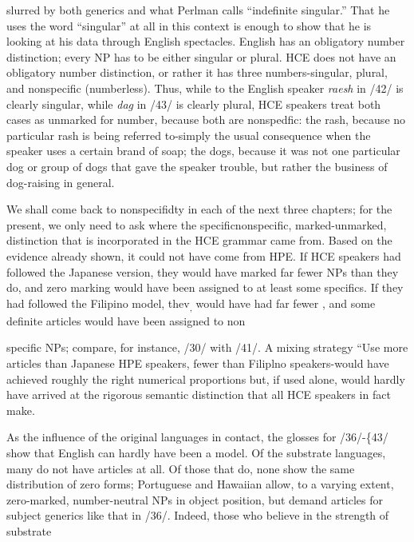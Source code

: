slurred by both generics and what Perlman calls ``indefinite singular.'' That he uses the word ``singular'' at all in this context is enough to show that he is looking at his data through English spectacles. English has an obligatory number distinction; every NP has to be either singular or plural. HCE does not have an obligatory number distinction, or rather it has three numbers-singular, plural, and nonspecific (number\-less). Thus, while to the English speaker \textit{raesh} in /42/ is clearly singular, while \textit{d}\textit{ag} in /43/ is clearly plural, HCE speakers treat both cases as unmarked for number, because both are nonspedfic: the rash, because no particular rash is being referred to-simply the usual consequence when the speaker uses a certain brand of soap; the dogs, because it was not one particular dog or group of dogs that gave the speaker trouble, but rather the business of dog-raising in general.

We shall come back to nonspecifidty in each of the next three chapters; for the present, we only need to ask where the specific\-nonspecific, marked-unmarked, distinction that is incorporated in the HCE grammar came from. Based on the evidence already shown, it could not have come from HPE. If HCE speakers had followed the Japanese version, they would have marked far fewer NPs than they do, and zero marking would have been assigned to at least some specifics. If they had followed the Filipino model, thev\textsubscript{,}\textsubscript{ }would have had far fewer \zeros, and some definite articles would have been assigned to non\-

specific NPs; compare, for instance, /30/ with /41/. A mixing strategy\- ``Use more articles than Japanese HPE speakers, fewer than Filiplno speakers{\textquotedbl}-would have achieved roughly the right numerical propor\-tions but, if used alone, would hardly have arrived at the rigorous semantic distinction that all HCE speakers in fact make.

As the influence of the original languages in contact, the glosses for /36/-\{43/ show that English can hardly have been a model. Of the substrate languages, many do not have articles at all. Of those that do, none show the same distribution of zero forms; Portuguese and Hawaiian allow, to a varying extent, zero-marked, number-neutral NPs in object position, but demand articles for subject generics like that in /36/. Indeed, those who believe in the strength of substrate


